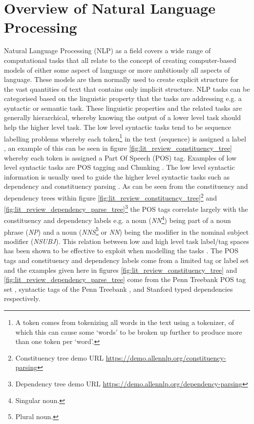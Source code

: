 \section{Overview of Natural Language Processing}
Natural Language Processing (NLP) as a field covers a wide range of computational tasks that all relate to the concept of creating computer-based models of either some aspect of language or more ambitiously all aspects of language. These models are then normally used to create explicit structure for the vast quantities of text that contains only implicit structure. NLP tasks can be categorised based on the linguistic property that the tasks are addressing e.g. a syntactic or semantic task. These linguistic properties and the related tasks are generally hierarchical, whereby knowing the output of a lower level task should help the higher level task. The low level syntactic tasks tend to be sequence labelling problems whereby each token\footnote{A token comes from tokenizing all words in the text using a tokenizer, of which this can cause some `words' to be broken up further to produce more than one token per `word'.} \citep{kaplan2005method,dridan-oepen-2012-tokenization} in the text (sequence) is assigned a label \citep{yannakoudakis-etal-2017-neural}, an example of this can be seen in figure \ref{fig:lit_review_constituency_tree} whereby each token is assigned a Part Of Speech (POS) tag. Examples of low level syntactic tasks are POS tagging \citep{church-1988-stochastic, ling-etal-2015-finding} and Chunking \citep{tjong-kim-sang-buchholz-2000-introduction}. The low level syntactic information is usually used to guide the higher level syntactic tasks such as dependency \citep{nivre-etal-2007-conll} and constituency parsing \citep{collins-2003-head}. As can be seen from the constituency and dependency trees within figure \ref{fig:lit_review_constituency_tree}\footnote{Constituency tree demo URL \url{https://demo.allennlp.org/constituency-parsing}} and \ref{fig:lit_review_dependency_parse_tree}\footnote{Dependency tree demo URL \url{https://demo.allennlp.org/dependency-parsing}} the POS tags correlate largely with the constituency and dependency labels e.g. a noun (\textit{NN}\footnote{Singular noun.}) being part of a noun phrase (\textit{NP}) and a noun (\textit{NNS}\footnote{Plural noun.} or \textit{NN}) being the modifier in the nominal subject modifier (\textit{NSUBJ}). This relation between low and high level task label/tag spaces has been shown to be effective to exploit when modelling the tasks \citep{hashimoto-etal-2017-joint}. The POS tags and constituency and dependency labels come from a limited tag or label set and the examples given here in figures \ref{fig:lit_review_constituency_tree} and \ref{fig:lit_review_dependency_parse_tree} come from the Penn Treebank POS tag set \citep{taylor2003penn}, syntactic tags of the Penn Treebank \citep{taylor2003penn}, and Stanford typed dependencies \citep{de2008stanford} respectively.

